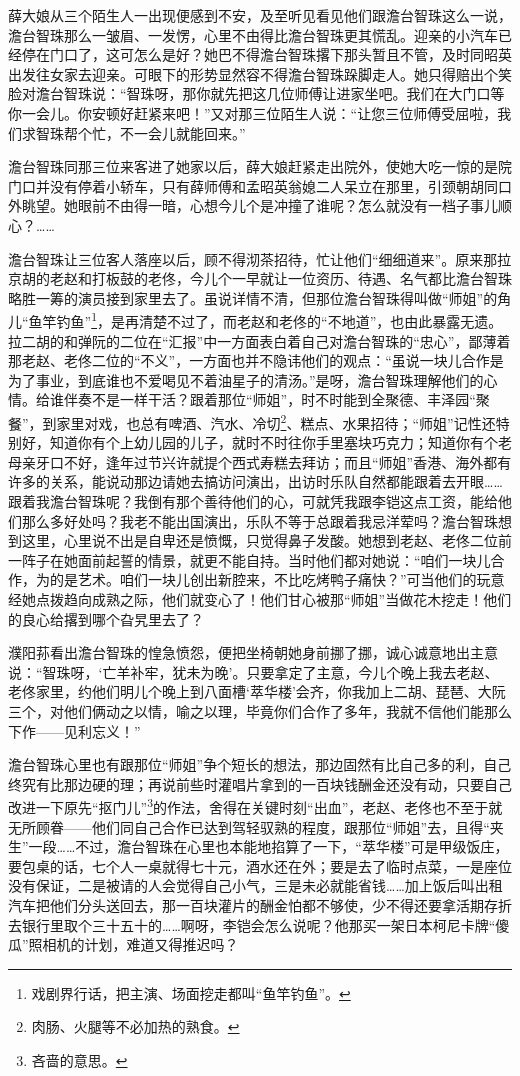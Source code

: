 \par 薛大娘从三个陌生人一出现便感到不安，及至听见看见他们跟澹台智珠这么一说，澹台智珠那么一皱眉、一发愣，心里不由得比澹台智珠更其慌乱。迎亲的小汽车已经停在门口了，这可怎么是好？她巴不得澹台智珠撂下那头暂且不管，及时同昭英出发往女家去迎亲。可眼下的形势显然容不得澹台智珠跺脚走人。她只得赔出个笑脸对澹台智珠说：“智珠呀，那你就先把这几位师傅让进家坐吧。我们在大门口等你一会儿。你安顿好赶紧来吧！”又对那三位陌生人说：“让您三位师傅受屈啦，我们求智珠帮个忙，不一会儿就能回来。”
\par 澹台智珠同那三位来客进了她家以后，薛大娘赶紧走出院外，使她大吃一惊的是院门口并没有停着小轿车，只有薛师傅和孟昭英翁媳二人呆立在那里，引颈朝胡同口外眺望。她眼前不由得一暗，心想今儿个是冲撞了谁呢？怎么就没有一档子事儿顺心？……
\par 澹台智珠让三位客人落座以后，顾不得沏茶招待，忙让他们“细细道来”。原来那拉京胡的老赵和打板鼓的老佟，今儿个一早就让一位资历、待遇、名气都比澹台智珠略胜一筹的演员接到家里去了。虽说详情不清，但那位澹台智珠得叫做“师姐”的角儿“鱼竿钓鱼”\footnote{戏剧界行话，把主演、场面挖走都叫“鱼竿钓鱼”。}，是再清楚不过了，而老赵和老佟的“不地道”，也由此暴露无遗。拉二胡的和弹阮的二位在“汇报”中一方面表白着自己对澹台智珠的“忠心”，鄙薄着那老赵、老佟二位的“不义”，一方面也并不隐讳他们的观点：“虽说一块儿合作是为了事业，到底谁也不爱喝见不着油星子的清汤。”是呀，澹台智珠理解他们的心情。给谁伴奏不是一样干活？跟着那位“师姐”，时不时能到全聚德、丰泽园“聚餐”，到家里对戏，也总有啤酒、汽水、冷切\footnote{肉肠、火腿等不必加热的熟食。}、糕点、水果招待；“师姐”记性还特别好，知道你有个上幼儿园的儿子，就时不时往你手里塞块巧克力；知道你有个老母亲牙口不好，逢年过节兴许就提个西式寿糕去拜访；而且“师姐”香港、海外都有许多的关系，能说动那边请她去搞访问演出，出访时乐队自然都能跟着去开眼……跟着我澹台智珠呢？我倒有那个善待他们的心，可就凭我跟李铠这点工资，能给他们那么多好处吗？我老不能出国演出，乐队不等于总跟着我忌洋荤吗？澹台智珠想到这里，心里说不出是自卑还是愤慨，只觉得鼻子发酸。她想到老赵、老佟二位前一阵子在她面前起誓的情景，就更不能自持。当时他们都对她说：“咱们一块儿合作，为的是艺术。咱们一块儿创出新腔来，不比吃烤鸭子痛快？”可当他们的玩意经她点拨趋向成熟之际，他们就变心了！他们甘心被那“师姐”当做花木挖走！他们的良心给撂到哪个旮旯里去了？
\par 濮阳荪看出澹台智珠的惶急愤怨，便把坐椅朝她身前挪了挪，诚心诚意地出主意说：“智珠呀，‘亡羊补牢，犹未为晚’。只要拿定了主意，今儿个晚上我去老赵、老佟家里，约他们明儿个晚上到八面槽‘萃华楼’会齐，你我加上二胡、琵琶、大阮三个，对他们俩动之以情，喻之以理，毕竟你们合作了多年，我就不信他们能那么下作——见利忘义！”
\par 澹台智珠心里也有跟那位“师姐”争个短长的想法，那边固然有比自己多的利，自己终究有比那边硬的理；再说前些时灌唱片拿到的一百块钱酬金还没有动，只要自己改进一下原先“抠门儿”\footnote{吝啬的意思。}的作法，舍得在关键时刻“出血”，老赵、老佟也不至于就无所顾眷——他们同自己合作已达到驾轻驭熟的程度，跟那位“师姐”去，且得“夹生”一段……不过，澹台智珠在心里也本能地掐算了一下，“萃华楼”可是甲级饭庄，要包桌的话，七个人一桌就得七十元，酒水还在外；要是去了临时点菜，一是座位没有保证，二是被请的人会觉得自己小气，三是未必就能省钱……加上饭后叫出租汽车把他们分头送回去，那一百块灌片的酬金怕都不够使，少不得还要拿活期存折去银行里取个三十五十的……啊呀，李铠会怎么说呢？他那买一架日本柯尼卡牌“傻瓜”照相机的计划，难道又得推迟吗？
